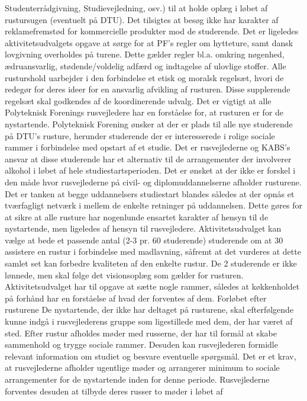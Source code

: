 Studenterrådgivning, Studievejledning, osv.) til at holde oplæg i løbet af rustursugen (eventuelt på DTU). Det tilsigtes
at besøg ikke har karakter af reklamefremstød for kommercielle produkter mod de studerende. Det er ligeledes
aktivitetsudvalgets opgave at sørge for at PF’s regler om hytteture, samt dansk lovgivning overholdes på turene. Dette
gælder regler bl.a. omkring nøgenhed, ædruansvarlig, stødende/voldelig adfærd og indtagelse af ulovlige stoffer.
Alle rusturshold uarbejder i den forbindelse et etisk og moralsk regelsæt, hvori de redegør for deres ideer for en
ansvarlig afvikling af rusturen. Disse supplerende regelsæt skal godkendes af de koordinerende udvalg. Det er vigtigt at
alle Polyteknisk Forenings rusvejledere har en forståelse for, at rusturen er for de nystartende. Polyteknisk Forening
ønsker at der er plads til alle nye studerende på DTU’s rusture, herunder studerende der er interesserede i rolige sociale
rammer i forbindelse med opstart af et studie. Det er rusvejlederne og KABS’s ansvar at disse studerende har et
alternativ til de arrangementer der involverer alkohol i løbet af hele studiestartsperioden.
Det er ønsket at der ikke er forskel i den måde hvor rusvejlederne på civil- og diplomuddannelserne afholder rusturene.
Det er tanken at begge uddannelsers studiestart blandes således at der opnås et tværfagligt netværk i mellem de enkelte
retninger på uddannelsen.
Dette gøres for at sikre at alle rusture har nogenlunde ensartet karakter af hensyn til de nystartende, men ligeledes af
hensyn til rusvejledere. Aktivitetsudvalget kan vælge at bede et passende antal (2-3 pr. 60 studerende) studerende om at
30
assistere en rustur i forbindelse med madlavning, såfremt at det vurderes at dette samlet set kan forbedre kvaliteten af
den enkelte rustur. De 2 studerende er ikke lønnede, men skal følge det visionsoplæg som gælder for rusturen.
Aktivitetsudvalget har til opgave at sætte nogle rammer, således at køkkenholdet på forhånd har en forståelse af hvad
der forventes af dem.
Forløbet efter rusturene
De nystartende, der ikke har deltaget på rusturene, skal efterfølgende kunne indgå i rusvejlederens gruppe som
ligestillede med dem, der har været af sted.
Efter rustur afholdes møder med russerne, der har til formål at skabe sammenhold og trygge sociale rammer. Desuden
kan rusvejlederen formidle relevant information om studiet og besvare eventuelle spørgsmål.
Det er et krav, at rusvejlederne afholder ugentlige møder og arrangerer minimum to sociale arrangementer for de
nystartende inden for denne periode. Rusvejlederne forventes desuden at tilbyde deres russer to møder i løbet af

